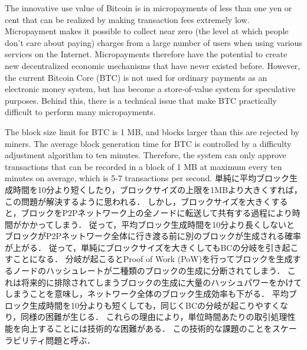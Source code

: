 \documentclass[graybox]{svmult}
\begin{document}
The innovative use value of Bitcoin is in micropayments of less than one yen or cent that can be realized by making transaction fees extremely low. 
Micropayment makes it possible to collect near zero (the level at which people don't care about paying) charges from a large number of users when using various services on the Internet.
Micropayments therefore have the potential to create new decentralized economic mechanisms that have never existed before.
However, the current Bitcoin Core (BTC) \cite{btc} is not used for ordinary payments as an electronic money system, but has become a store-of-value system for speculative purposes. 
Behind this, there is a technical issue that make BTC practically difficult to perform many micropayments. 

The block size limit for BTC is 1 MB, and blocks larger than this are rejected by miners. 
The average block generation time for BTC is controlled by a difficulty adjustment algorithm to ten minutes. 
Therefore, the system can only approve transactions that can be recorded in a block of 1 MB at maximum every ten minutes on average, which is 5-7 transactions per second. 
単純に平均ブロック生成時間を10分より短くしたり，ブロックサイズの上限を1MBより大きくすれば，この問題が解決するように思われる．
しかし，ブロックサイズを大きくすると，ブロックをP2Pネットワーク上の全ノードに転送して共有する過程により時間がかかってしまう．
従って，平均ブロック生成時間を10分より長くしないとブロックがP2Pネットワーク全体に行き渡る前に別のブロックが生成される確率が上がる．
従って，単純にブロックサイズを大きくしてもBCの分岐を引き起こすことになる．
分岐が起こるとProof of Work (PoW)を行ってブロックを生成するノードのハッシュレートが二種類のブロックの生成に分断されてしまう．
これは将来的に排除されてしまうブロックの生成に大量のハッシュパワーをかけてしまうことを意味し，ネットワーク全体のブロック生成効率も下がる．
平均ブロック生成時間を10分よりも短くしても，同じくBCの分岐が起こりやすくなり，同様の困難が生じる．
これらの理由により，単位時間あたりの取引処理性能を向上することには技術的な困難がある．
この技術的な課題のことをスケーラビリティ問題と呼ぶ．
\end{document}
